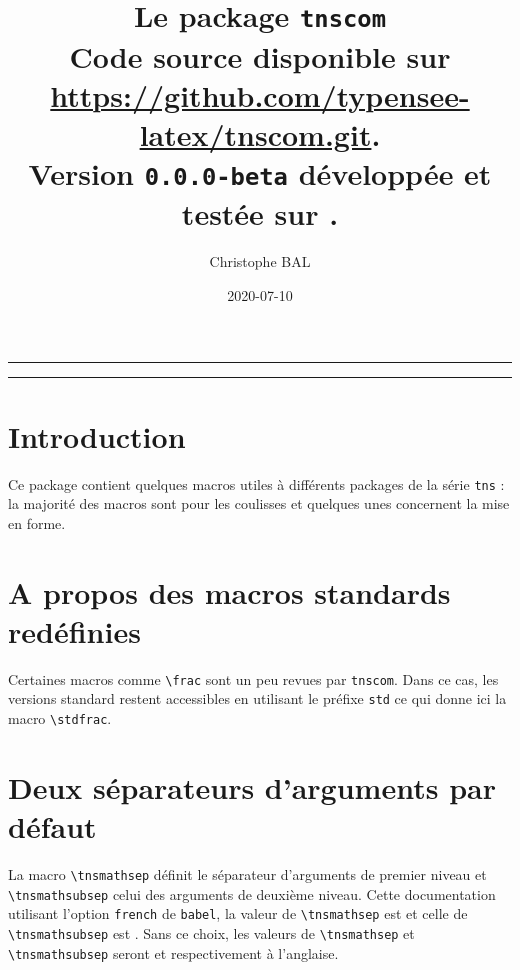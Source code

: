 \documentclass[12pt,a4paper]{article}
\newcommand\env[1]{\texttt{#1}}
\newcommand\macro[1]{\env{\textbackslash{}#1}}
\theoremstyle{definition}
\newcommand\prefix[1]{%
	\texttt{#1}%
}
\begin{document}
\renewcommand\labelitemi{\raisebox{0.125em}{\tiny\textbullet}}
\renewcommand{\labelitemii}{---}

\title{  %
	Le package \texttt{tnscom}\\%
	{\footnotesize Code source disponible sur \url{https://github.com/typensee-latex/tnscom.git}.}\\%
{\footnotesize Version \texttt{0.0.0-beta} développée et testée sur \macosxname{}.}%
}
\author{Christophe BAL}
\date{2020-07-10}{{{{{{{{{{{

\maketitle


\vspace{2em}

\hrule

\tableofcontents

\vspace{1.5em}

\hrule

\newpage

\section{Introduction}

Ce package contient quelques macros utiles à différents packages de la série \verb+tns+ : la majorité des macros sont pour les coulisses et quelques unes concernent la mise en forme.




\section{A propos des macros standards redéfinies}

Certaines macros comme \verb+\frac+ sont un peu revues par \verb+tnscom+.
Dans ce cas, les versions standard restent accessibles en utilisant le préfixe \prefix{std} ce qui donne ici la macro \macro{stdfrac}.
\section{Deux séparateurs d'arguments par défaut}

La macro \macro{tnsmathsep} définit le séparateur d'arguments de premier niveau et \macro{tnsmathsubsep} celui des arguments de deuxième niveau.
Cette documentation utilisant l'option \verb+french+ de \verb+babel+, la valeur de 
\macro{tnsmathsep} est \fbox{\,\tnsmathsep$\vphantom{F}$\,} 
et celle de
\macro{tnsmathsubsep} est \fbox{\,\tnsmathsubsep$\vphantom{F}$\,} .
Sans ce choix, les valeurs de \macro{tnsmathsep} et \macro{tnsmathsubsep} seront \fbox{\,\tnsmathsubsep$\vphantom{F}$\,} et \fbox{\,\tnsmathsep$\vphantom{F}$\,} respectivement à l'anglaise.
}}}}}}}}}}}
\end{document}
